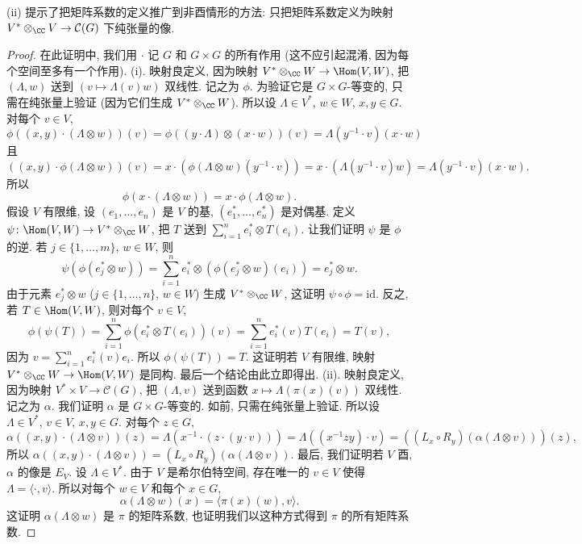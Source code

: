 \begin{remark}[非酉情形的矩阵系数]
\label{rem:IV.3.7}
(ii) 提示了把矩阵系数的定义推广到非酉情形的方法: 只把矩阵系数定义为映射 $V^* \otimes_{\CC}V \to \mathcal{C}(G)$ 下纯张量的像.
\end{remark}

\begin{proof}
在此证明中, 我们用 $\cdot$ 记 $G$ 和 $G \times G$ 的所有作用 (这不应引起混淆, 因为每个空间至多有一个作用).
(i). 映射良定义, 因为映射 $V^* \otimes_{\CC}W \to \Hom(V, W)$, 把 $(\Lambda, w)$ 送到 $(v \longmapsto \Lambda(v)w)$ 双线性. 记之为 $\phi$. 为验证它是 $G \times G$-等变的, 只需在纯张量上验证 (因为它们生成 $V^* \otimes_{\CC}W$). 所以设 $\Lambda \in V^*$, $w \in W$, $x, y \in G$. 对每个 $v \in V$,
\[
\phi((x, y) \cdot (\Lambda \otimes w))(v) = \phi((y \cdot \Lambda) \otimes (x \cdot w))(v) = \Lambda(y^{-1} \cdot v)(x \cdot w)
\]
且
\[
((x, y) \cdot \phi(\Lambda \otimes w))(v) = x \cdot (\phi(\Lambda \otimes w)(y^{-1} \cdot v)) = x \cdot (\Lambda(y^{-1} \cdot v)w) = \Lambda(y^{-1} \cdot v)(x \cdot w).
\]
所以
\[
\phi(x \cdot (\Lambda \otimes w)) = x \cdot \phi(\Lambda \otimes w).
\]
假设 $V$ 有限维, 设 $(e_1, \ldots, e_n)$ 是 $V$ 的基, $(e_1^*, \ldots, e_n^*)$ 是对偶基. 定义 $\psi \colon \Hom(V, W) \to V^* \otimes_{\CC}W$, 把 $T$ 送到 $\sum_{i=1}^n e_i^* \otimes T(e_i)$. 让我们证明 $\psi$ 是 $\phi$ 的逆.
若 $j \in \{1, \ldots, m\}$, $w \in W$, 则
\[
\psi(\phi(e_j^* \otimes w)) = \sum_{i=1}^n e_i^* \otimes (\phi(e_j^* \otimes w)(e_i)) = e_j^* \otimes w.
\]
由于元素 $e_j^* \otimes w$ ($j \in \{1, \ldots, n\}$, $w \in W$) 生成 $V^* \otimes_{\CC}W$, 这证明 $\psi \circ \phi = \mathrm{id}$.
反之, 若 $T \in \Hom(V, W)$, 则对每个 $v \in V$,
\[
\phi(\psi(T)) = \sum_{i=1}^n\phi(e_i^* \otimes T(e_i))(v) = \sum_{i=1}^n e_i^*(v)T(e_i) = T(v),
\]
因为 $v = \sum_{i=1}^n e_i^*(v)e_i$. 所以 $\phi(\psi(T)) = T$.
这证明若 $V$ 有限维, 映射 $V^* \otimes_{\CC}W \to \Hom(V, W)$ 是同构. 最后一个结论由此立即得出.
(ii). 映射良定义, 因为映射 $V^* \times V \to \mathcal{C}(G)$, 把 $(\Lambda, v)$ 送到函数 $x \longmapsto \Lambda(\pi(x)(v))$ 双线性. 记之为 $\alpha$. 我们证明 $\alpha$ 是 $G \times G$-等变的. 如前, 只需在纯张量上验证. 所以设 $\Lambda \in V^*$, $v \in V$, $x, y \in G$. 对每个 $z \in G$,
\[
\alpha((x, y) \cdot (\Lambda \otimes v))(z) = \Lambda(x^{-1} \cdot (z \cdot (y \cdot v))) = \Lambda((x^{-1}zy) \cdot v) = ((L_x \circ R_y)(\alpha(\Lambda \otimes v)))(z),
\]
所以 $\alpha((x, y) \cdot (\Lambda \otimes v)) = (L_x \circ R_y)(\alpha(\Lambda \otimes v))$.
最后, 我们证明若 $V$ 酉, $\alpha$ 的像是 $E_V$. 设 $\Lambda \in V^*$. 由于 $V$ 是希尔伯特空间, 存在唯一的 $v \in V$ 使得 $\Lambda = \langle \cdot, v \rangle$. 所以对每个 $w \in V$ 和每个 $x \in G$,
\[
\alpha(\Lambda \otimes w)(x) = \langle \pi(x)(w), v \rangle.
\]
这证明 $\alpha(\Lambda \otimes w)$ 是 $\pi$ 的矩阵系数, 也证明我们以这种方式得到 $\pi$ 的所有矩阵系数.
\end{proof}

